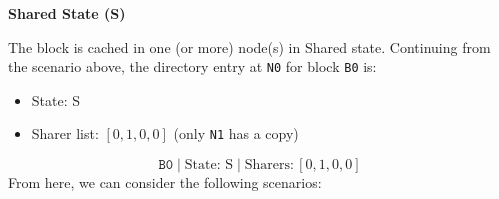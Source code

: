 \begin{flushleft}
    \textcolor{Green3}{ \textbf{Shared State (S)}}
\end{flushleft}
The block is cached in one (or more) node(s) in Shared state. Continuing from the scenario above, the directory entry at \texttt{N0} for block \texttt{B0} is:
\begin{itemize}
    \item State: S
    \item Sharer list: $[0, 1, 0, 0]$ (only \texttt{N1} has a copy)
\end{itemize}
\begin{equation*}
    \texttt{B0} \; | \; \text{State: S} \; | \; \text{Sharers:} \, \left[0, 1, 0, 0\right]
\end{equation*}
From here, we can consider the following scenarios:
